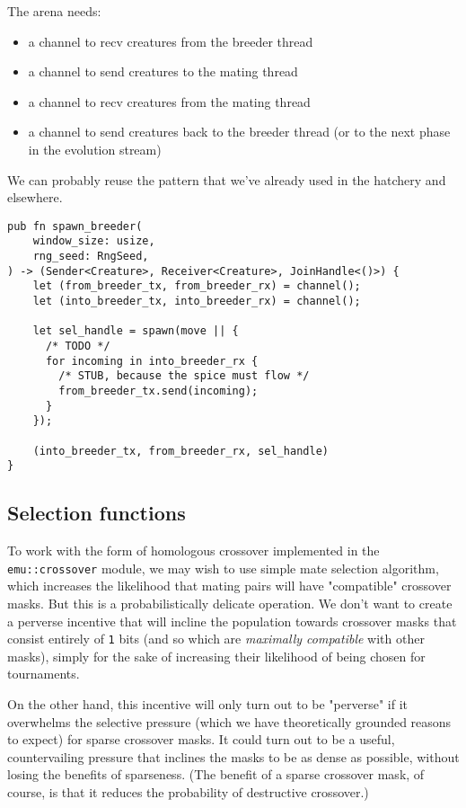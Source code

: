 \documentclass[11pt]{article}
\begin{document}
The arena needs:
\begin{itemize}
\item a channel to recv creatures from the breeder thread
\item a channel to send creatures to the mating thread
\item a channel to recv creatures from the mating thread
\item a channel to send creatures back to the breeder thread
(or to the next phase in the evolution stream)
\end{itemize}

We can probably reuse the pattern that we've already used in
the hatchery and elsewhere. 


\lstset{language=rust,label=org3ae3607,caption= ,captionpos=b,numbers=none}
\begin{lstlisting}
pub fn spawn_breeder(
    window_size: usize,
    rng_seed: RngSeed,
) -> (Sender<Creature>, Receiver<Creature>, JoinHandle<()>) {
    let (from_breeder_tx, from_breeder_rx) = channel();
    let (into_breeder_tx, into_breeder_rx) = channel();

    let sel_handle = spawn(move || {
      /* TODO */
      for incoming in into_breeder_rx {
        /* STUB, because the spice must flow */
        from_breeder_tx.send(incoming);
      }
    });

    (into_breeder_tx, from_breeder_rx, sel_handle)
}
\end{lstlisting}

\subsection{Selection functions}
\label{sec:org77de66d}

To work with the form of homologous crossover implemented in the
\texttt{emu::crossover} module, we may wish to use simple mate selection
algorithm, which increases the likelihood that mating pairs will
have "compatible" crossover masks. But this is a probabilistically
delicate operation. We don't want to create a perverse incentive
that will incline the population towards crossover masks that consist
entirely of \texttt{1} bits (and so which are \emph{maximally compatible} with other
masks), simply for the sake of increasing their likelihood of being
chosen for tournaments. 

On the other hand, this incentive will only turn out to be "perverse"
if it overwhelms the selective pressure (which we have theoretically
grounded reasons to expect) for sparse crossover masks. It could turn
out to be a useful, countervailing pressure that inclines the masks
to be as dense as possible, without losing the benefits of sparseness.
(The benefit of a sparse crossover mask, of course, is that it reduces
the probability of destructive crossover.)
\end{document}
